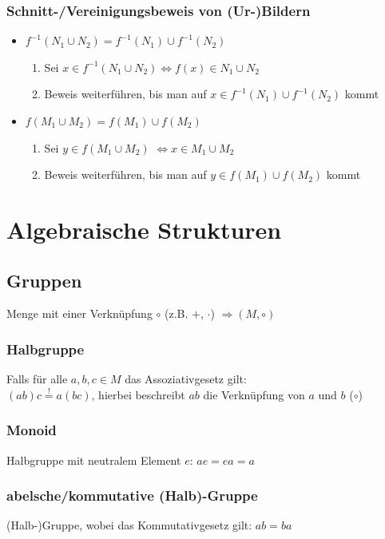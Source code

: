 \documentclass[german, fourcolumn, 8pt]{latex4ei/latex4ei_sheet}
\newcommand{\equival}[0]{\ensuremath{\Longleftrightarrow}}
\begin{document}
\begin{sectionbox}
    \subsubsection{Schnitt-/Vereinigungsbeweis von (Ur-)Bildern}
    \begin{itemize}
        \item $f^{-1}(N_1 \cup N_2) = f^{-1}(N_1) \cup f^{-1}(N_2)$\\
              \vspace{-2mm}
              \begin{enumerate}
                  \item Sei $x\in f^{-1}(N_1 \cup N_2) \equival f(x) \in N_1 \cup N_2$
                  \item Beweis weiterführen, bis man auf $x \in f^{-1}(N_1) \cup f^{-1}(N_2)$ kommt
              \end{enumerate}
    \end{itemize}
    \begin{itemize}
        \item $f(M_1 \cup M_2) = f(M_1) \cup f(M_2)$\\
              \vspace{-2mm}
              \begin{enumerate}
                  \item Sei $y \in f(M_1 \cup M_2)$ \equival $x\in M_1 \cup M_2$
                  \item Beweis weiterführen, bis man auf $y \in f(M_1) \cup f(M_2)$ kommt
              \end{enumerate}
    \end{itemize}
\end{sectionbox}

\section{Algebraische Strukturen}
\subsection{Gruppen}
Menge mit einer Verknüpfung $\circ$ (z.B. $+$, $\cdot$) $\Rightarrow (M, \circ)$
\begin{sectionbox}
    \subsubsection{Halbgruppe}
    Falls für alle $a,b,c \in M$ das Assoziativgesetz gilt:\\
    $(ab)c \overset{!}{=} a(bc)$, hierbei beschreibt $ab$ die Verknüpfung von $a$ und $b$ ($\circ$)
    \subsubsection{Monoid}
    Halbgruppe mit neutralem Element $e$: $ae=ea=a$
    \subsubsection{abelsche/kommutative (Halb)-Gruppe}
    (Halb-)Gruppe, wobei das Kommutativgesetz gilt: $ab=ba$
\end{sectionbox}
\end{document}
